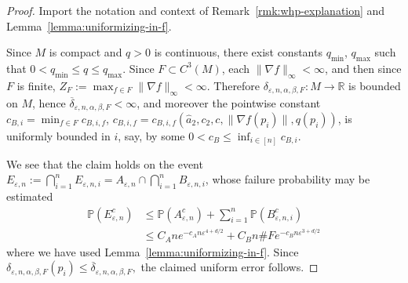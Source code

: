 \documentclass{article}
\theoremstyle{remark}
\theoremstyle{plain}
\begin{document}
\begin{proof}

Import the notation and context of Remark~\ref{rmk:whp-explanation} and Lemma~\ref{lemma:uniformizing-in-f}. 

Since $M$ is compact and $q>0$ is continuous, there exist constants $q_{\text{min}}$, $q_{\text{max}}$ such that $0<q_{\text{min}} \leq q \leq q_{\text{max}}$. Since $F \subset C^{3}(M)$, each $\|\nabla f\|_{\infty}<\infty$, and then since $F$ is finite, $Z_{F}:=\max_{f \in F}\|\nabla f\|_{\infty}<\infty$.  Therefore $\delta_{\varepsilon, n, \alpha, \beta, F}:M \to \mathbb{R}$ is bounded on $M$, hence $\overline{\delta}_{\varepsilon, n, \alpha, \beta, F}<\infty$, and moreover the pointwise constant $c_{B,i}=\min_{f \in F} c_{B, i, f}$, $c_{B,i,f}=c_{B,i,f}(\hat{a}_{2}, c_{2}, c, \|\nabla f(p_{i})\|, q(p_{i}))$, is uniformly bounded in $i$, say, by some $0<c_{B}\leq \inf_{i \in [n]}c_{B,i}$. 

We see that the claim holds on the event $E_{\varepsilon, n}:= \bigcap_{i=1}^{n} E_{\varepsilon , n, i}=A_{\varepsilon, n} \cap \bigcap_{i=1}^{n}B_{\varepsilon, n, i}$, whose failure probability may be estimated
\begin{align}
\mathbb{P}(E_{\varepsilon, n}^{c})&\leq \mathbb{P}(A_{\varepsilon, n}^{c})+ \sum_{i=1}^{n} \mathbb{P}(B_{\varepsilon, n, i}^{c}) \\
&\leq C_{A}n e^{-c_{A}n \varepsilon^{4+d/2}}+C_{B}n\# F e^{-c_{B}n \varepsilon^{3+d/2}}
\end{align}
where we have used Lemma~\ref{lemma:uniformizing-in-f}. Since $\delta_{\varepsilon, n ,\alpha, \beta, F}(p_{i})\leq  \overline{\delta}_{\varepsilon, n , \alpha, \beta, F},$ the claimed uniform error follows. 

\end{proof}
\end{document}
